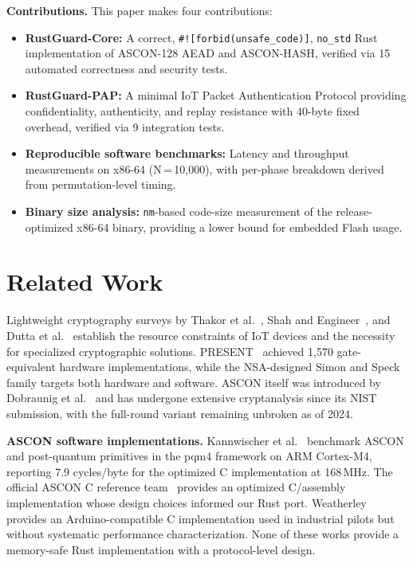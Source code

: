 \documentclass[conference]{IEEEtran}
\begin{document}
\textbf{Contributions.} This paper makes four contributions:
\begin{itemize}
  \item \textbf{RustGuard-Core:} A correct, \texttt{\#![forbid(unsafe\_code)]},
        \texttt{no\_std} Rust implementation of ASCON-128 AEAD and ASCON-HASH,
        verified via 15 automated correctness and security tests.
  \item \textbf{RustGuard-PAP:} A minimal IoT Packet Authentication Protocol
        providing confidentiality, authenticity, and replay resistance with
        40-byte fixed overhead, verified via 9 integration tests.
  \item \textbf{Reproducible software benchmarks:} Latency and throughput
        measurements on x86-64 (N\,=\,10{,}000), with per-phase breakdown
        derived from permutation-level timing.
  \item \textbf{Binary size analysis:} \texttt{nm}-based code-size measurement
        of the release-optimized x86-64 binary, providing a lower bound for
        embedded Flash usage.
\end{itemize}

\section{Related Work}
\label{sec:related}

Lightweight cryptography surveys by Thakor et al.~\cite{b6}, Shah and
Engineer~\cite{b7}, and Dutta et al.~\cite{b8} establish the resource
constraints of IoT devices and the necessity for specialized cryptographic
solutions. PRESENT~\cite{b3} achieved 1{,}570 gate-equivalent hardware
implementations, while the NSA-designed Simon and Speck~\cite{b4} family
targets both hardware and software. ASCON itself was introduced by Dobraunig
et al.~\cite{b9} and has undergone extensive cryptanalysis since its NIST
submission, with the full-round variant remaining unbroken as of 2024.

\textbf{ASCON software implementations.}
Kannwischer et al.~\cite{b10} benchmark ASCON and post-quantum primitives in
the pqm4 framework on ARM Cortex-M4, reporting 7.9 cycles/byte for the
optimized C implementation at 168\,MHz. The official ASCON C reference
team~\cite{b12} provides an optimized C/assembly implementation whose
design choices informed our Rust port. Weatherley~\cite{b11} provides an
Arduino-compatible C implementation used in industrial pilots but without
systematic performance characterization. None of these works provide a
memory-safe Rust implementation with a protocol-level design.
\end{document}
